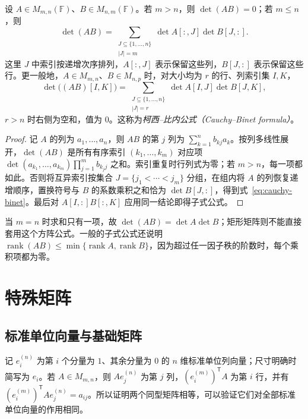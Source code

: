 \begin{theorem}
\label{thm:cauchy-binet}
设 $A\in M_{m,n}(\mathbb F)$、$B\in M_{n,m}(\mathbb F)$。若 $m>n$，则 $\det(AB)=0$；若 $m\le n$，则
\begin{equation}
 \det(AB)=\sum_{\substack{J\subseteq\{1,\ldots,n\}\\|J|=m}}
 \det A[:,J]\det B[J,:].
 \label{eq:cauchy-binet}
\end{equation}
这里 $J$ 中索引按递增次序排列，$A[:,J]$ 表示保留这些列，$B[J,:]$ 表示保留这些行。更一般地，$A\in M_{m,n}$、$B\in M_{n,p}$ 时，对大小均为 $r$ 的行、列索引集 $I,K$，
\begin{equation}
 \det\bigl((AB)[I,K]\bigr)
 =\sum_{\substack{J\subseteq\{1,\ldots,n\}\\|J|=r}}
 \det A[I,J]\det B[J,K],
 \label{eq:cauchy-binet-minor}
\end{equation}
$r>n$ 时右侧为空和，值为 $0$。这称为\emph{柯西--比内公式（Cauchy--Binet formula）}。
\end{theorem}
\begin{proof}
记 $A$ 的列为 $a_1,\ldots,a_n$，则 $AB$ 的第 $j$ 列为 $\sum_{k=1}^n b_{kj}a_k$。按列多线性展开，$\det(AB)$ 是所有有序索引 $(k_1,\ldots,k_m)$ 对应项 $\det(a_{k_1},\ldots,a_{k_m})\prod_{j=1}^m b_{k_jj}$ 之和。索引重复时行列式为零；若 $m>n$，每一项都如此。否则将互异索引按集合 $J=\{j_1<\cdots<j_m\}$ 分组，在组内将 $A$ 的列恢复递增顺序，置换符号与 $B$ 的系数乘积之和恰为 $\det B[J,:]$，得到式~\eqref{eq:cauchy-binet}。最后对 $A[I,:]B[:,K]$ 应用同一结论即得子式公式。
\end{proof}

当 $m=n$ 时求和只有一项，故 $\det(AB)=\det A\det B$；矩形矩阵则不能直接套用这个方阵公式。一般的子式公式还说明 $\operatorname{rank}(AB)\le\min\{\operatorname{rank}A,\operatorname{rank}B\}$，因为超过任一因子秩的阶数时，每个乘积项都为零。

\section{特殊矩阵}
\label{sec:matrix-special}

\subsection{标准单位向量与基础矩阵}

记 $e_i^{(n)}$ 为第 $i$ 个分量为 $1$、其余分量为 $0$ 的 $n$ 维标准单位列向量；尺寸明确时简写为 $e_i$。若 $A\in M_{m,n}$，则 $Ae_j^{(n)}$ 为第 $j$ 列，$(e_i^{(m)})^{\mathsf T}A$ 为第 $i$ 行，并有 $(e_i^{(m)})^{\mathsf T}Ae_j^{(n)}=a_{ij}$。所以证明两个同型矩阵相等，可以验证它们对全部标准单位向量的作用相同。

